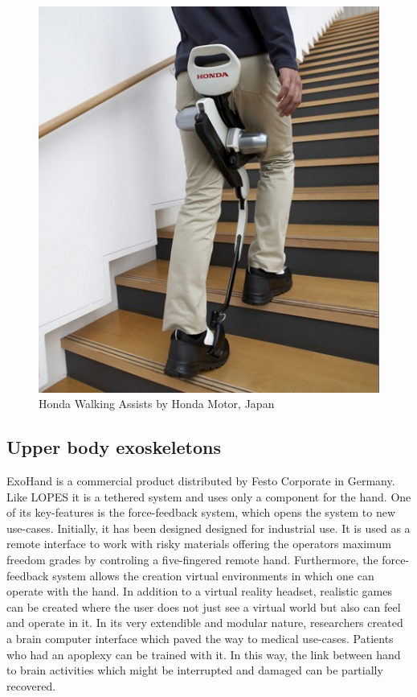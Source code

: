 \documentclass[letterpaper, 10 pt, conference]{ieeeconf}  %
\begin{document}
\begin{figure}[H]
  \centering
    \includegraphics[scale=0.5]{img/honda}
  \caption{Honda Walking Assists by Honda Motor, Japan}
\end{figure}
\newpage


\subsection{Upper body exoskeletons}

ExoHand is a commercial product distributed by Festo Corporate in Germany. Like LOPES it is a tethered system and
uses only a component for the hand. One of its key-features is the force-feedback system, which opens the system to
new use-cases. Initially, it has been designed designed for industrial use. It is used as a remote interface to
work with risky materials offering the operators maximum freedom grades by controling a five-fingered remote hand.
Furthermore, the force-feedback system allows the creation virtual environments in which one can operate with the hand.
In addition to a virtual reality headset, realistic games can be created where the user does not just see a virtual
world but also can feel and operate in it. In its very extendible and modular nature, researchers created a brain
computer interface which paved the way to medical use-cases. Patients who had an apoplexy can be trained with it.
In this way, the link between hand to brain activities which might be interrupted and damaged can be partially recovered.
\end{document}
